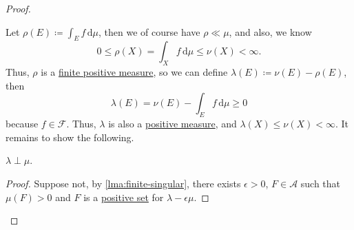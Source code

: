 \begin{proof}
\begin{enumerate}
		      Let \(\rho(E) \coloneqq \int_E f \,\mathrm{d} \mu\), then we of course have \(\rho \ll \mu\), and also, we know
		      \[
			      0 \leq \rho(X) = \int_X f \,\mathrm{d} \mu \leq \nu(X) < \infty.
		      \]
		      Thus, \(\rho\) is a \hyperref[def:finite-signed-measure]{finite positive measure}, so we can define \(\lambda(E) \coloneqq \nu(E) - \rho(E)\), then
		      \[
			      \lambda(E) = \nu(E) - \int_E f \,\mathrm{d} \mu \geq 0
		      \]
		      because \(f \in \mathscr{F}\). Thus, \(\lambda\) is also a \hyperref[def:signed-measure]{positive measure}, and \(\lambda(X) \leq \nu(X) < \infty\).
		      It remains to show the following.

		      \begin{claim}
			      \(\lambda \perp \mu\).
		      \end{claim}
		      \begin{proof}
			      Suppose not, by \autoref{lma:finite-singular}, there exists \(\epsilon > 0\), \(F \in \mathcal{A}\) such that \(\mu(F) > 0\) and \(F\) is a
			      \hyperref[def:positive-set-for-a-signed-measure]{positive set} for \(\lambda - \epsilon \mu\).


\end{proof}
\end{enumerate}
\end{proof}
